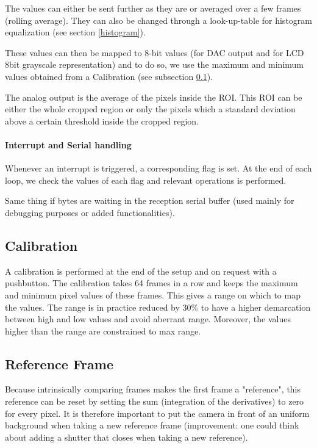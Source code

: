 \documentclass[a4paper]{article}
\begin{document}
The values can either be sent further as they are or averaged over a few frames (rolling average).
They can also be changed through a look-up-table for histogram equalization (see section \ref{histogram}).

These values can then be mapped to 8-bit values (for DAC output and for LCD 8bit grayscale representation) and to do so, we use the maximum and minimum values obtained from a Calibration (see subsection \ref{calibration}).

The analog output is the average of the pixels inside the ROI. This ROI can be either the whole cropped region or only the pixels which a standard deviation above a certain threshold inside the cropped region. 

\paragraph{Interrupt and Serial handling}
Whenever an interrupt is triggered, a corresponding flag is set. At the end of each loop, we check the values of each flag and relevant operations is performed.

Same thing if bytes are waiting in the reception serial buffer (used mainly for debugging purposes or added functionalities).


\subsection{Calibration}
\label{calibration}
A calibration is performed at the end of the setup and on request with a pushbutton. The calibration takes 64 frames in a row and keeps the maximum and minimum pixel values of these frames. This gives a range on which to map the values. The range is in practice reduced by 30\% to have a higher demarcation between high and low values and avoid aberrant range. Moreover, the values higher than the range are constrained to max range.

\subsection{Reference Frame}
Because intrinsically comparing frames makes the first frame a "reference", this reference can be reset by setting the sum (integration of the derivatives) to zero for every pixel.
It is therefore important to put the camera in front of an uniform background when taking a new reference frame (improvement: one could think about adding a shutter that closes when taking a new reference). 
\end{document}
